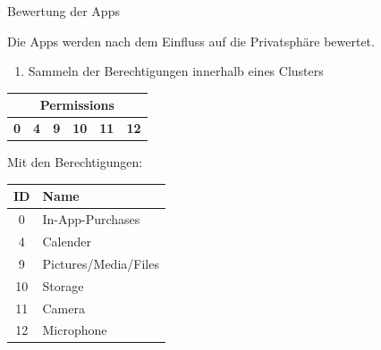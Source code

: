 \documentclass[compress,t]{beamer}
\begin{document}
\begin{frame}{Bewertung der Apps}

    Die Apps werden nach dem Einfluss auf die Privatsphäre bewertet.

    \begin{enumerate}
        \item Sammeln der Berechtigungen innerhalb eines Clusters
    \end{enumerate}

    \begin{center}
    \begin{tabular}{|*{6}{c|}}
        \multicolumn{6}{c}{Permissions} \tabularnewline
        \hline
        \textbf{0} & \textbf{4} & \textbf{9} & \textbf{10} & \textbf{11} & \textbf{12} \\
        \hline
    \end{tabular}
    \end{center}

    Mit den Berechtigungen:
    \begin{center}
    \begin{tabular}{ | c | l | }
        \hline
        \textbf{ID} & \textbf{Name} \\
        \hline
        0 & In-App-Purchases \\
        4 & Calender \\
        9 & Pictures/Media/Files \\
        10 & Storage \\
        11 & Camera \\
        12 & Microphone \\
        \hline
    \end{tabular}
    \end{center}

\end{frame}
\end{document}
